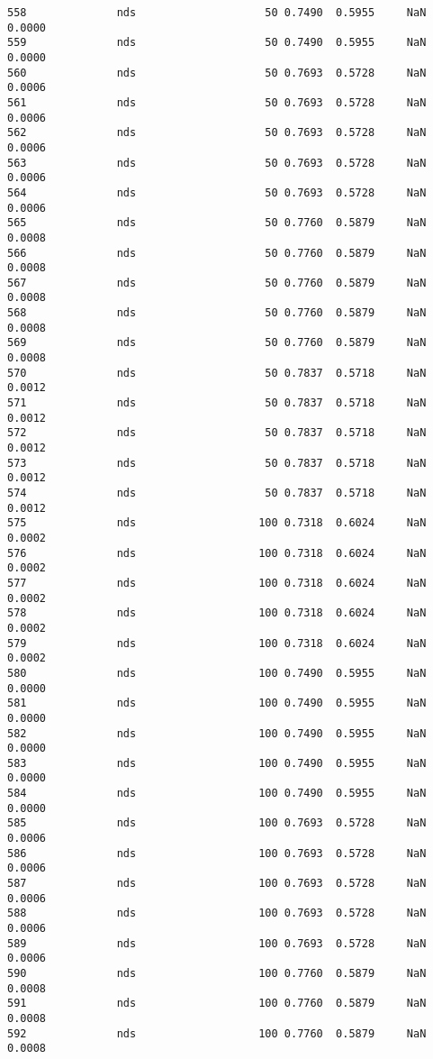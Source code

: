\documentclass[11pt]{article}
\begin{document}
\begin{Verbatim}[commandchars=\\\{\}]
558              nds                    50 0.7490  0.5955     NaN 0.0000   
559              nds                    50 0.7490  0.5955     NaN 0.0000   
560              nds                    50 0.7693  0.5728     NaN 0.0006   
561              nds                    50 0.7693  0.5728     NaN 0.0006   
562              nds                    50 0.7693  0.5728     NaN 0.0006   
563              nds                    50 0.7693  0.5728     NaN 0.0006   
564              nds                    50 0.7693  0.5728     NaN 0.0006   
565              nds                    50 0.7760  0.5879     NaN 0.0008   
566              nds                    50 0.7760  0.5879     NaN 0.0008   
567              nds                    50 0.7760  0.5879     NaN 0.0008   
568              nds                    50 0.7760  0.5879     NaN 0.0008   
569              nds                    50 0.7760  0.5879     NaN 0.0008   
570              nds                    50 0.7837  0.5718     NaN 0.0012   
571              nds                    50 0.7837  0.5718     NaN 0.0012   
572              nds                    50 0.7837  0.5718     NaN 0.0012   
573              nds                    50 0.7837  0.5718     NaN 0.0012   
574              nds                    50 0.7837  0.5718     NaN 0.0012   
575              nds                   100 0.7318  0.6024     NaN 0.0002   
576              nds                   100 0.7318  0.6024     NaN 0.0002   
577              nds                   100 0.7318  0.6024     NaN 0.0002   
578              nds                   100 0.7318  0.6024     NaN 0.0002   
579              nds                   100 0.7318  0.6024     NaN 0.0002   
580              nds                   100 0.7490  0.5955     NaN 0.0000   
581              nds                   100 0.7490  0.5955     NaN 0.0000   
582              nds                   100 0.7490  0.5955     NaN 0.0000   
583              nds                   100 0.7490  0.5955     NaN 0.0000   
584              nds                   100 0.7490  0.5955     NaN 0.0000   
585              nds                   100 0.7693  0.5728     NaN 0.0006   
586              nds                   100 0.7693  0.5728     NaN 0.0006   
587              nds                   100 0.7693  0.5728     NaN 0.0006   
588              nds                   100 0.7693  0.5728     NaN 0.0006   
589              nds                   100 0.7693  0.5728     NaN 0.0006   
590              nds                   100 0.7760  0.5879     NaN 0.0008   
591              nds                   100 0.7760  0.5879     NaN 0.0008   
592              nds                   100 0.7760  0.5879     NaN 0.0008   

\end{Verbatim}
\end{document}
